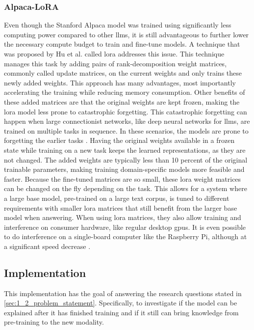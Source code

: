         \subsubsection{Alpaca-LoRA}
        Even though the Stanford Alpaca model was trained using significantly less computing power compared to other \glspl{llm}, it is still advantageous to further lower the necessary compute budget to train and fine-tune models. A technique that was proposed by Hu et al. called \gls{lora} \cite{huLoRALowRankAdaptation2021} addresses this issue. This technique manages this task by adding pairs of rank-decomposition weight matrices, commonly called update matrices, on the current weights and only trains these newly added weights. This approach has many advantages, most importantly accelerating the training while reducing memory consumption. Other benefits of these added matrices are that the original weights are kept frozen, making the \gls{lora} model less prone to catastrophic forgetting. This catastrophic forgetting can happen when large connectionist networks, like deep neural networks for \glspl{llm}, are trained on multiple tasks in sequence. In these scenarios, the models are prone to forgetting the earlier tasks \cite{mccloskeyCatastrophicInterferenceConnectionist1989}. Having the original weights available in a frozen state while training on a new task keeps the learned representations, as they are not changed. The added weights are typically less than 10 percent of the original trainable parameters, making training domain-specific models more feasible and faster. 
        Because the fine-tuned matrices are so small, these \gls{lora} weight matrices can be changed on the fly depending on the task. 
        This allows for a system where a large base model, pre-trained on a large text corpus, is tuned to different requirements with smaller \gls{lora} matrices that still benefit from the larger base model when answering.
        When using \gls{lora} matrices, they also allow training and interference on consumer hardware, like regular desktop \glspl{gpu}. It is even possible to do interference on a single-board computer like the Raspberry Pi, although at a significant speed decrease \cite{artemandreenko[@miolini]VeSucefullyRunned2023}. 


        \subsection{Implementation}
        This implementation has the goal of answering the research questions stated in \ref{sec:1_2_problem_statement}. Specifically, to investigate if the model can be explained after it has finished training and if it still can bring knowledge from pre-training to the new modality.
        
